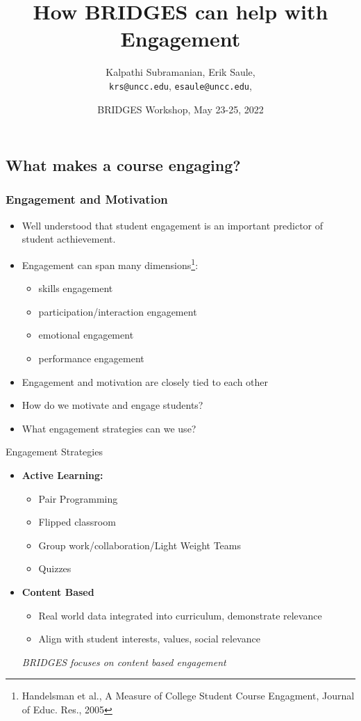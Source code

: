 \documentclass[aspectratio=169]{beamer}
\title{How BRIDGES can help with Engagement}
\subtitle{}
\author{Kalpathi Subramanian, Erik Saule, \\\texttt{krs@uncc.edu}, \texttt{esaule@uncc.edu}, }
\institute{$^1$The University of North Carolina at Charlotte}
\date{BRIDGES Workshop, May 23-25, 2022}
\begin{document}
\begin{frame}
\titlepage
\end{frame}




\subsection{What makes a course engaging?}

\begin{frame}
	\frametitle{Engagement and Motivation}
\begin{itemize} 
	\item Well understood that student engagement is an important
		predictor of student acthievement.
	\item Engagement can span many dimensions\footnote{Handelsman et al., 
	A Measure of College Student Course Engagment, Journal of Educ. Res., 2005}: 
		\begin{itemize}
			\item skills engagement
			\item participation/interaction engagement
			\item emotional engagement
			\item performance engagement
		\end{itemize}
	\item Engagement and motivation are closely tied to each other
	\item How do we motivate and engage students? 
	\item What engagement  strategies  can we use? 
\end{itemize}
\end{frame}
\begin{frame}{Engagement Strategies}
\begin{itemize}
	\item \textbf{Active Learning:}
	\begin{itemize}
		\item Pair Programming
		\item Flipped classroom
		\item Group work/collaboration/Light Weight Teams
		\item Quizzes
	\end{itemize}
	\item \textbf{Content Based}
	\begin{itemize}
		\item Real world data integrated into  curriculum, demonstrate
			relevance
		\item Align with student interests, values, social relevance
	\end{itemize}
\vspace*{0.2in}
\textsl{\large BRIDGES focuses on content based engagement}
\end{itemize}
\end{frame}
\end{document}
